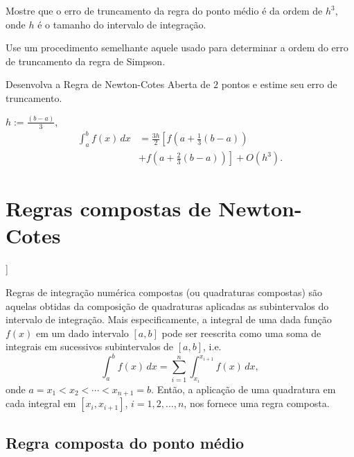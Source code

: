 \begin{exer}\label{cap_integr_sec_nc:exer:trunc_pto_medio}
  Mostre que o erro de truncamento da regra do ponto médio é da ordem de $h^3$, onde $h$ é o tamanho do intervalo de integração.
\end{exer}
\begin{resp}
  Use um procedimento semelhante aquele usado para determinar a ordem do erro de truncamento da regra de Simpson.
\end{resp}

\begin{exer}\label{cap_integr_sec_nc:exer:NC_aberta_2pts}
  Desenvolva a Regra de Newton-Cotes Aberta de $2$ pontos e estime seu erro de truncamento.
\end{exer}
\begin{resp}
  $h:=\frac{(b-a)}{3}$,
  \begin{equation*}
    \begin{aligned}
      \int_a^bf(x)\,dx &= \frac{3h}{2}\left[f\left(a+\frac{1}{3}(b-a)\right)\right. \\
      &+ \left. f\left(a + \frac{2}{3}(b-a)\right)\right] + O(h^3).
    \end{aligned}
\end{equation*}
\end{resp}

\section{Regras compostas de Newton-Cotes}\label{cap_integr_sec_int_comp}

\begin{flushleft}
  [[tag:revisar]]
\end{flushleft}

Regras de integração numérica compostas (ou quadraturas compostas) são aquelas obtidas da composição de quadraturas aplicadas as subintervalos do intervalo de integração. Mais especificamente, a integral de uma dada função $f(x)$ em um dado intervalo $[a, b]$ pode ser reescrita como uma soma de integrais em sucessivos subintervalos de $[a, b]$, i.e.
\begin{equation}
  \int_a^b f(x)\,dx = \sum_{i=1}^{n} \int_{x_i}^{x_{i+1}}f(x)\,dx,
\end{equation}
onde $a=x_1 < x_2 < \cdots < x_{n+1}=b$. Então, a aplicação de uma quadratura em cada integral em $[x_i, x_{i+1}]$, $i=1, 2, \dotsc, n$, nos fornece uma regra composta.

\subsection{Regra composta do ponto médio}

